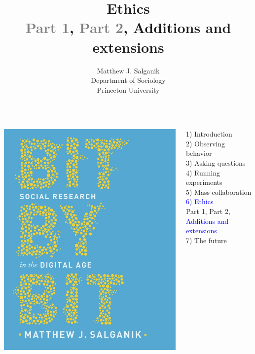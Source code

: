 \documentclass{beamer}
\title[]{Ethics\\ \textcolor{gray}{Part 1}, \textcolor{gray}{Part 2}, Additions and extensions}
\author[]{Matthew J. Salganik\\Department of Sociology\\Princeton University}
\date[]{%
\begin{flushright}
\texttt{[image: figures/cc-by.png]}
\end{flushright}
}
\begin{document}
\frame{\titlepage}
\begin{frame}

\begin{columns}
\begin{column}{.40\textwidth}
\includegraphics[width=\textwidth]{figures/salganik_bit_2018_cover}
\end{column}%

\hfill%

\begin{column}{.60\textwidth}
1) Introduction \\
2) Observing behavior \\
3) Asking questions \\
4) Running experiments \\
5) Mass collaboration \\
\textcolor{blue}{6) Ethics} \\
Part 1, Part 2, \textcolor{blue}{Additions and extensions} \\
7) The future \\
\end{column}%
\end{columns}

\end{frame}
\end{document}
